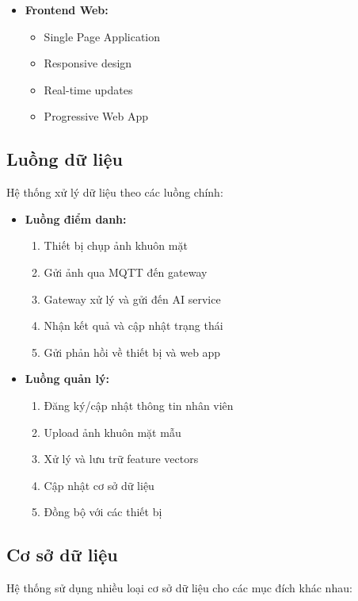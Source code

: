 \begin{itemize}
    \item \textbf{Frontend Web:}
    \begin{itemize}
        \item Single Page Application
        \item Responsive design
        \item Real-time updates
        \item Progressive Web App
    \end{itemize}
\end{itemize}

\subsection{Luồng dữ liệu}
\hspace{0.5cm}Hệ thống xử lý dữ liệu theo các luồng chính:

\begin{itemize}
    \item \textbf{Luồng điểm danh:}
    \begin{enumerate}
        \item Thiết bị chụp ảnh khuôn mặt
        \item Gửi ảnh qua MQTT đến gateway
        \item Gateway xử lý và gửi đến AI service
        \item Nhận kết quả và cập nhật trạng thái
        \item Gửi phản hồi về thiết bị và web app
    \end{enumerate}
    
    \item \textbf{Luồng quản lý:}
    \begin{enumerate}
        \item Đăng ký/cập nhật thông tin nhân viên
        \item Upload ảnh khuôn mặt mẫu
        \item Xử lý và lưu trữ feature vectors
        \item Cập nhật cơ sở dữ liệu
        \item Đồng bộ với các thiết bị
    \end{enumerate}
\end{itemize}

\subsection{Cơ sở dữ liệu}
\hspace{0.5cm}Hệ thống sử dụng nhiều loại cơ sở dữ liệu cho các mục đích khác nhau:

